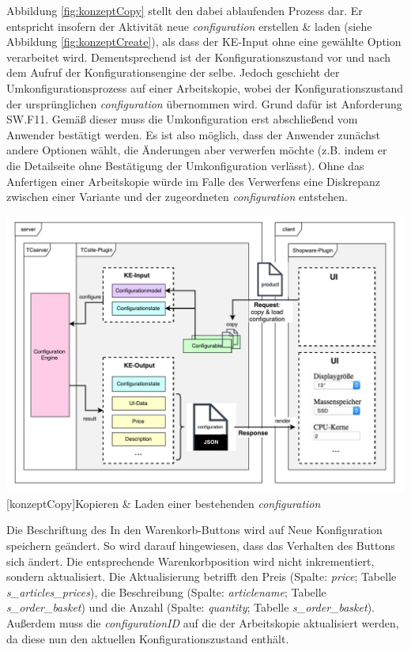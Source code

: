 \documentclass[11pt, a4paper, titlepage, listof=totoc, bibliography=totoc, index=totoc, twoside, openright, headings=normal, draft]{scrreprt}
\begin{document}
Abbildung \ref{fig:konzeptCopy} stellt den dabei ablaufenden Prozess dar. Er entspricht insofern der Aktivität \glqq neue \emph{configuration} erstellen \& laden\grqq{} (siehe Abbildung \ref{fig:konzeptCreate}), als dass der KE-Input ohne eine gewählte Option verarbeitet wird. Dementsprechend ist der Konfigurationszustand vor und nach dem Aufruf der Konfigurationsengine der selbe. Jedoch geschieht der Umkonfigurationsprozess auf einer Arbeitskopie, wobei der Konfigurationszustand der ursprünglichen \emph{configuration} übernommen wird. Grund dafür ist Anforderung SW.F11. Gemäß dieser muss die Umkonfiguration erst abschließend vom Anwender bestätigt werden. Es ist also möglich, dass der Anwender zunächst andere Optionen wählt, die Änderungen aber verwerfen möchte (z.B. indem er die Detailseite ohne Bestätigung der Umkonfiguration verlässt). Ohne das Anfertigen einer Arbeitskopie würde im Falle des Verwerfens eine Diskrepanz zwischen einer Variante und der zugeordneten \emph{configuration} entstehen.

\vspace{1em}
\begin{minipage}{\linewidth}
	\centering
	\includegraphics[width=1\linewidth]{Abbildungen/konzeptCopy.pdf}
	[konzeptCopy]{Kopieren \& Laden einer bestehenden \emph{configuration}}
	\label{fig:konzeptCopy}
\end{minipage}
\vspace{1em}

Die Beschriftung des \glqq In den Warenkorb\grqq{}-Buttons wird auf \glqq Neue Konfiguration speichern\grqq{} geändert. So wird darauf hingewiesen, dass das Verhalten des Buttons sich ändert. Die entsprechende Warenkorbposition wird nicht inkrementiert, sondern aktualisiert. Die Aktualisierung betrifft den Preis (Spalte: \emph{price}; Tabelle \emph{s\_articles\_prices}), die Beschreibung (Spalte: \emph{articlename}; Tabelle \emph{s\_order\_basket}) und die Anzahl (Spalte: \emph{quantity}; Tabelle \emph{s\_order\_basket}). Außerdem muss die \emph{configurationID} auf die der Arbeitskopie aktualisiert werden, da diese nun den aktuellen Konfigurationszustand enthält.
\end{document}
